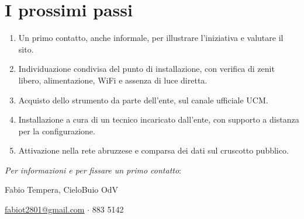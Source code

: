 \documentclass[11pt,a4paper]{report}
\begin{document}
\section*{I prossimi passi}

\begin{enumerate}
\item Un primo contatto, anche informale, per illustrare l'iniziativa e valutare il sito.
\item Individuazione condivisa del punto di installazione, con verifica di zenit libero, alimentazione, WiFi e assenza di luce diretta.
\item Acquisto dello strumento da parte dell'ente, sul canale ufficiale UCM.
\item Installazione a cura di un tecnico incaricato dall'ente, con supporto a distanza per la configurazione.
\item Attivazione nella rete abruzzese e comparsa dei dati sul cruscotto pubblico.
\end{enumerate}

\vspace{0.4cm}

\begin{center}
\end{center}

\vspace{0.4cm}

\noindent\textit{Per informazioni e per fissare un primo contatto}:

\vspace{0.2cm}

\noindent Fabio Tempera, CieloBuio OdV

\url{fabiot2801@gmail.com} \quad $\cdot$  883 5142
\end{document}
